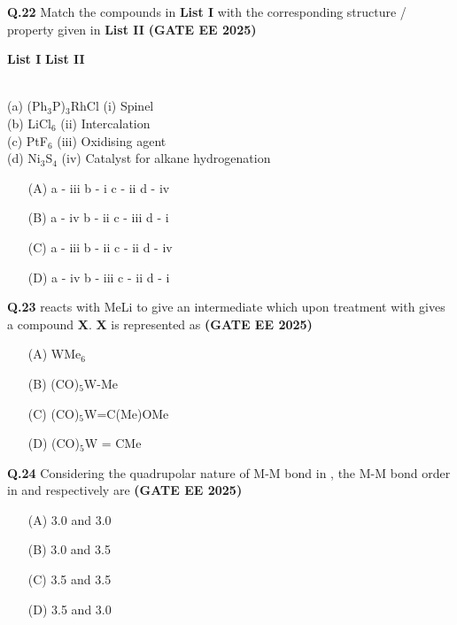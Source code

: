\documentclass[journal,12pt,onecolumn]{exam}
\theoremstyle{remark}
\begin{document}
\noindent \textbf{Q.22} Match the compounds in \textbf{List I} with the corresponding structure / property given in \textbf{List II} \hfill{\textbf{(GATE EE 2025)}}

\begin{tabbing}
\hspace{3cm} \= \textbf{List I} \hspace{5cm} \= \textbf{List II} 

\\
(a) (Ph$_3$P)$_3$RhCl \> (i) Spinel \\
(b) LiCl$_6$ \> (ii) Intercalation \\
(c) PtF$_6$ \> (iii) Oxidising agent \\
(d) Ni$_3$S$_4$ \> (iv) Catalyst for alkane hydrogenation \\

\end{tabbing}


\begin{itemize}[leftmargin=*,labelsep=1em]
    \item[(A)] a - iii \quad b - i \quad c - ii \quad d - iv
    \item[(B)] a - iv \quad b - ii \quad c - iii \quad d - i
    \item[(C)] a - iii \quad b - ii \quad c - ii \quad d - iv
    \item[(D)] a - iv \quad b - iii \quad c - ii \quad d - i
\end{itemize}

\vspace{0.5cm}

\noindent \textbf{Q.23}  reacts with MeLi to give an intermediate which upon treatment with  gives a compound \textbf{X}. \textbf{X} is represented as \hfill{\textbf{(GATE EE 2025)}}
\begin{multicols}{2}
\begin{itemize}[leftmargin=*,labelsep=1em]
    \item[(A)] WMe$_6$
    \item[(B)] (CO)$_5$W-Me
    \item[(C)] (CO)$_5$W=C(Me)OMe
    \item[(D)] (CO)$_5$W = CMe
\end{itemize}
\end{multicols}
\vspace{0.5cm}

\noindent \textbf{Q.24} Considering the quadrupolar nature of M-M bond in , the M-M bond order in \ch{[Re2Cl4(PMe2Ph)4]^{+}} and \ch{[Re2Cl4(PMe2Ph)4]} respectively are \hfill{\textbf{(GATE EE 2025)}}
\begin{multicols}{2}
\begin{itemize}[leftmargin=*,labelsep=1em]
    \item[(A)] 3.0 and 3.0
    \item[(B)] 3.0 and 3.5
    \item[(C)] 3.5 and 3.5
    \item[(D)] 3.5 and 3.0
\end{itemize}
\end{multicols}
\vspace{0.5cm}
\end{document}
